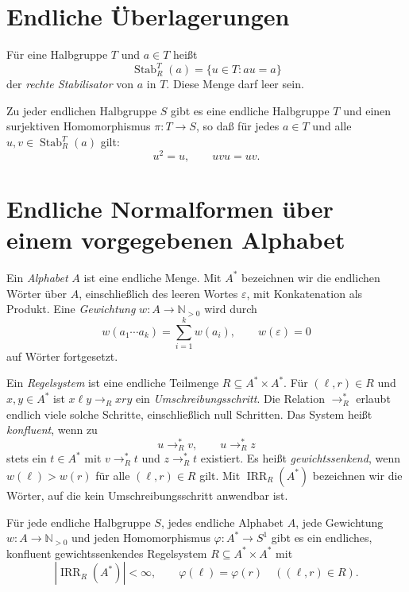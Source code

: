 \section{Endliche Überlagerungen}

\begin{definition}
Für eine Halbgruppe $T$ und $a\in T$ heißt
\[
 \operatorname{Stab}_{R}^{T}(a)=\{u\in T:au=a\}
\]
der \emph{rechte Stabilisator} von $a$ in $T$.
Diese Menge darf leer sein.
\end{definition}

\begin{theorem}
\label{thm:b37-guide-stabilizer-cover}
Zu jeder endlichen Halbgruppe $S$ gibt es eine endliche Halbgruppe $T$
und einen surjektiven Homomorphismus $\pi:T\to S$, so daß für jedes
$a\in T$ und alle $u,v\in\operatorname{Stab}_{R}^{T}(a)$ gilt:
\[
 u^2=u,\qquad uvu=uv.
\]
\cite[Satz~1.1]{LeSaecPinWeil1991}
\end{theorem}

\clearpage
\section{Endliche Normalformen über einem vorgegebenen Alphabet}

\begin{definition}
Ein \emph{Alphabet} $A$ ist eine endliche Menge. Mit $A^*$ bezeichnen
wir die endlichen Wörter über $A$, einschließlich des leeren Wortes
$\varepsilon$, mit Konkatenation als Produkt.
Eine \emph{Gewichtung} $w:A\to\mathbb N_{>0}$ wird durch
\[
 w(a_1\cdots a_k)=\sum_{i=1}^k w(a_i),\qquad w(\varepsilon)=0
\]
auf Wörter fortgesetzt.
\end{definition}

\begin{definition}
Ein \emph{Regelsystem} ist eine endliche Teilmenge $R\subseteq A^*\times A^*$.
Für $(\ell,r)\in R$ und $x,y\in A^*$ ist
$x\ell y\to_R xry$ ein \emph{Umschreibungsschritt}.
Die Relation $\to_R^*$ erlaubt endlich viele solche Schritte,
einschließlich null Schritten.
Das System heißt \emph{konfluent}, wenn zu
\[
 u\to_R^*v,\qquad u\to_R^*z
\]
stets ein $t\in A^*$ mit $v\to_R^*t$ und $z\to_R^*t$ existiert.
Es heißt \emph{gewichtssenkend}, wenn $w(\ell)>w(r)$ für alle
$(\ell,r)\in R$ gilt. Mit $\operatorname{IRR}_R(A^*)$ bezeichnen wir
die Wörter, auf die kein Umschreibungsschritt anwendbar ist.
\end{definition}

\begin{theorem}
\label{thm:b37-guide-church-rosser}
Für jede endliche Halbgruppe $S$, jedes endliche Alphabet $A$,
jede Gewichtung $w:A\to\mathbb N_{>0}$ und jeden Homomorphismus
$\varphi:A^*\to S^1$ gibt es ein endliches, konfluent
gewichtssenkendes Regelsystem $R\subseteq A^*\times A^*$ mit
\[
 |\operatorname{IRR}_R(A^*)|<\infty,
 \qquad
 \varphi(\ell)=\varphi(r)\quad((\ell,r)\in R).
\]
\cite[Satz~5.1]{DiekertKufleitnerReinhardtWalter2015}
\end{theorem}

